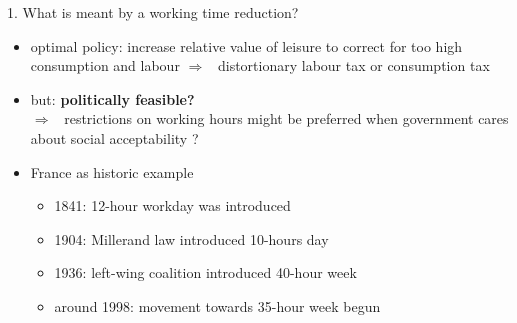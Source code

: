 \documentclass[11pt,aspectratio=169]{beamer}
\newcommand{\ar}{$\Rightarrow$ \ }
\begin{document}
\begin{frame}{1. What is meant by a working time reduction?}
	\begin{itemize}
		\item<+-> optimal policy: increase relative value of leisure to correct for too high consumption and labour \ar distortionary labour tax or consumption tax
		\vspace{1mm}
		\item<+-> but: \textbf{\alert{politically feasible?}} \\ \ar restrictions on working hours might be preferred when government cares about social acceptability \citep[as argued in][]{Alvarez-Cuadrado2007EnvyHours}?
		
			\vspace{1mm}
	\item<+-> France as historic example \citep[based on][]{Alvarez-Cuadrado2007EnvyHours}
	\begin{itemize}
		\item 1841: 12-hour workday was introduced
		\item 1904: Millerand law introduced 10-hours day
		\item 1936: left-wing coalition introduced 40-hour week
		\item around 1998: movement towards 35-hour week begun
	\end{itemize}
	\end{itemize}
	
\end{frame}
\end{document}
